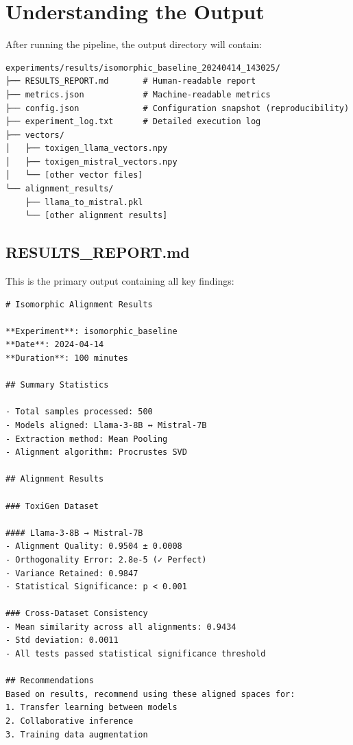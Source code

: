 \documentclass[12pt,a4paper,oneside]{report}
\begin{document}
\section{Understanding the Output}

After running the pipeline, the output directory will contain:

\begin{lstlisting}[caption=Output Structure]
experiments/results/isomorphic_baseline_20240414_143025/
├── RESULTS_REPORT.md       # Human-readable report
├── metrics.json            # Machine-readable metrics
├── config.json             # Configuration snapshot (reproducibility)
├── experiment_log.txt      # Detailed execution log
├── vectors/
│   ├── toxigen_llama_vectors.npy
│   ├── toxigen_mistral_vectors.npy
│   └── [other vector files]
└── alignment_results/
    ├── llama_to_mistral.pkl
    └── [other alignment results]
\end{lstlisting}

\subsection{RESULTS\_REPORT.md}

This is the primary output containing all key findings:

\begin{lstlisting}[caption=Sample RESULTS_REPORT.md]
# Isomorphic Alignment Results

**Experiment**: isomorphic_baseline
**Date**: 2024-04-14
**Duration**: 100 minutes

## Summary Statistics

- Total samples processed: 500
- Models aligned: Llama-3-8B ↔ Mistral-7B
- Extraction method: Mean Pooling
- Alignment algorithm: Procrustes SVD

## Alignment Results

### ToxiGen Dataset

#### Llama-3-8B → Mistral-7B
- Alignment Quality: 0.9504 ± 0.0008
- Orthogonality Error: 2.8e-5 (✓ Perfect)
- Variance Retained: 0.9847
- Statistical Significance: p < 0.001

### Cross-Dataset Consistency
- Mean similarity across all alignments: 0.9434
- Std deviation: 0.0011
- All tests passed statistical significance threshold

## Recommendations
Based on results, recommend using these aligned spaces for:
1. Transfer learning between models
2. Collaborative inference
3. Training data augmentation
\end{lstlisting}
\end{document}
